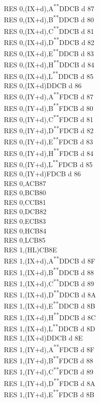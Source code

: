 \documentclass[twoside,openright,a4paper]{book}
\newcommand{\UNDOC}{\textnormal{\textsuperscript{**}}}
\begin{document}
\begin{multicols}{3}
{\begin{tabbing}
	RES 0,(IX+d),A\UNDOC\>DDCB d 87\\
	RES 0,(IX+d),B\UNDOC\>DDCB d 80\\
	RES 0,(IX+d),C\UNDOC\>DDCB d 81\\
	RES 0,(IX+d),D\UNDOC\>DDCB d 82\\
	RES 0,(IX+d),E\UNDOC\>DDCB d 83\\
	RES 0,(IX+d),H\UNDOC\>DDCB d 84\\
	RES 0,(IX+d),L\UNDOC\>DDCB d 85\\
	RES 0,(IX+d)\>DDCB d 86\\
	RES 0,(IY+d),A\UNDOC\>FDCB d 87\\
	RES 0,(IY+d),B\UNDOC\>FDCB d 80\\
	RES 0,(IY+d),C\UNDOC\>FDCB d 81\\
	RES 0,(IY+d),D\UNDOC\>FDCB d 82\\
	RES 0,(IY+d),E\UNDOC\>FDCB d 83\\
	RES 0,(IY+d),H\UNDOC\>FDCB d 84\\
	RES 0,(IY+d),L\UNDOC\>FDCB d 85\\
	RES 0,(IY+d)\>FDCB d 86\\
	RES 0,A\>CB87\\
	RES 0,B\>CB80\\
	RES 0,C\>CB81\\
	RES 0,D\>CB82\\
	RES 0,E\>CB83\\
	RES 0,H\>CB84\\
	RES 0,L\>CB85\\
	RES 1,(HL)\>CB8E\\
	RES 1,(IX+d),A\UNDOC\>DDCB d 8F\\
	RES 1,(IX+d),B\UNDOC\>DDCB d 88\\
	RES 1,(IX+d),C\UNDOC\>DDCB d 89\\
	RES 1,(IX+d),D\UNDOC\>DDCB d 8A\\
	RES 1,(IX+d),E\UNDOC\>DDCB d 8B\\
	RES 1,(IX+d),H\UNDOC\>DDCB d 8C\\
	RES 1,(IX+d),L\UNDOC\>DDCB d 8D\\
	RES 1,(IX+d)\>DDCB d 8E\\
	RES 1,(IY+d),A\UNDOC\>FDCB d 8F\\
	RES 1,(IY+d),B\UNDOC\>FDCB d 88\\
	RES 1,(IY+d),C\UNDOC\>FDCB d 89\\
	RES 1,(IY+d),D\UNDOC\>FDCB d 8A\\
	RES 1,(IY+d),E\UNDOC\>FDCB d 8B\\

\end{tabbing}}
\end{multicols}
\end{document}
